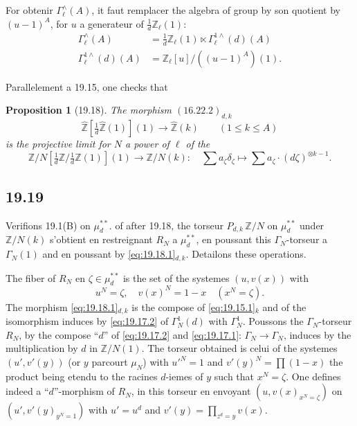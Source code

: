 \documentclass[12pt,a4paper]{article}
\theoremstyle{plain}
\newtheorem{proposition}[theorem]{Proposition}
\theoremstyle{definition}
\theoremstyle{remark}
\newcommand{\ZZ}{\mathbb{Z}}
\begin{document}
For obtenir $\Gamma_\ell^\wedge(A)$, it faut remplacer the algebra of
group by son quotient by $(u-1)^A$, for $u$ a generateur of
$\frac{1}{d}\ZZ_\ell(1)$:
\begin{align*}
\Gamma_\ell^\wedge(A) &= \tfrac{1}{d}\ZZ_\ell(1) \ltimes
\Gamma_\ell^{1\wedge}(d)(A) \\
\Gamma_\ell^{1\wedge}(d)(A) &= \ZZ_\ell[u]/((u-1)^A)(1).
\end{align*}

Parallelement a 19.15, one checks that

\begin{proposition}[19.18]\label{prop:19.18}
The morphism $(16.22.2)_{d,k}$
\[
\hat{\ZZ}[\tfrac{1}{d}\hat{\ZZ}(1)](1) \to \hat{\ZZ}(k) \qquad (1 \leq k
\leq A)
\]
is the projective limit for $N$ a power of $\ell$ of the
\begin{equation}\label{eq:19.18.1}
\ZZ/N[\tfrac{1}{d}\ZZ/\tfrac{1}{d}\ZZ(1)](1) \to \ZZ/N(k) : \quad
\sum a_\zeta \delta_\zeta \longmapsto \sum a_\zeta \cdot (d\zeta)^{\otimes k-1}.
\end{equation}
\end{proposition}

\subsection{19.19}

Verifions 19.1(B) on $\mu_d^{**}$. of after 19.18, the torseur
$P_{d,k}\, \ZZ/N$ on $\mu_d^{**}$ under $\ZZ/N(k)$ s'obtient en
restreignant $R_N$ a $\mu_d^{**}$, en poussant this
$\Gamma_N$-torseur a $\Gamma_N(1)$ and en poussant by
\eqref{eq:19.18.1}$_{d,k}$. Detailons these operations.

The fiber of $R_N$ en $\zeta \in \mu_d^{**}$ is the set of the
systemes $(u, v(x))$ with
\[
u^N = \zeta, \quad v(x)^N = 1-x \quad (x^N = \zeta).
\]
The morphism \eqref{eq:19.18.1}$_{d,k}$ is the compose of
\eqref{eq:19.15.1}$_k$ and of the isomorphism induces by
\eqref{eq:19.17.2} of $\Gamma_N^1(d)$ with $\Gamma_N^1$. Poussons the
$\Gamma_N$-torseur $R_N$, by the compose ``$d$'' of
\eqref{eq:19.17.2} and \eqref{eq:19.17.1}: $\Gamma_N \to \Gamma_N$,
induces by the multiplication by $d$ in $\ZZ/N(1)$. The torseur
obtained is celui of the systemes $(u', v'(y))$ (or $y$ parcourt
$\mu_N$) with $u'^N = 1$ and $v'(y)^N = \prod(1-x)$ the product being
etendu to the racines $d$-iemes of $y$ such that $x^N = \zeta$. One defines indeed a ``$d$''-morphism of $R_N$, in this torseur en
envoyant $(u, v(x)_{x^N=\zeta})$ on $(u', v'(y)_{y^N=1})$ with
$u' = u^d$ and $v'(y) = \prod_{z^d=y} v(x)$.
\end{document}
